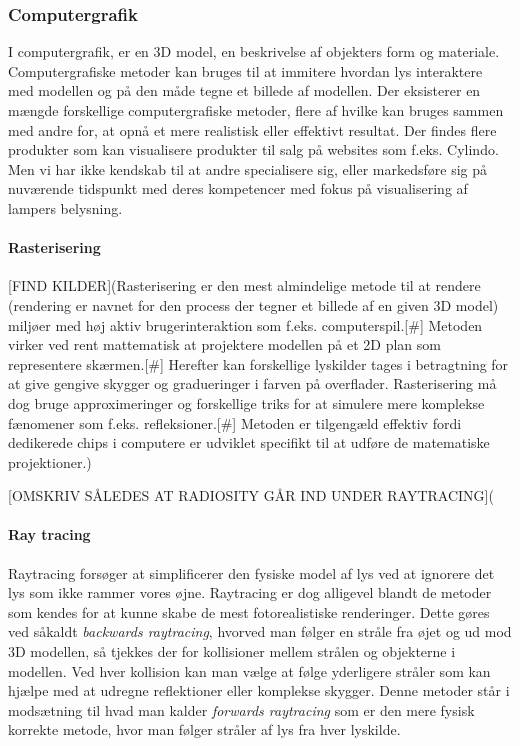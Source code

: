 
\subsubsection{Computergrafik}
I computergrafik, er en 3D model, en beskrivelse af objekters form og materiale.\cite{computergrafik_introduktion} Computergrafiske metoder kan bruges til at immitere hvordan lys interaktere med modellen og på den måde tegne et billede af modellen. Der eksisterer en mængde forskellige computergrafiske metoder, flere af hvilke kan bruges sammen med andre for, at opnå et mere realistisk eller effektivt resultat. Der findes flere produkter som kan visualisere produkter til salg på websites som f.eks. Cylindo\cite{Cylindo}. Men vi har ikke kendskab til at andre specialisere sig, eller markedsføre sig på nuværende tidspunkt med deres kompetencer med fokus på visualisering af lampers belysning.

\paragraph{Rasterisering}
[FIND KILDER](Rasterisering er den mest almindelige metode til at rendere (rendering er navnet for den process der tegner et billede af en given 3D model) miljøer med høj aktiv brugerinteraktion som f.eks. computerspil.[#] Metoden virker ved rent mattematisk at projektere modellen på et 2D plan som representere skærmen.[#] Herefter kan forskellige lyskilder tages i betragtning for at give gengive skygger og gradueringer i farven på overflader. Rasterisering må dog bruge approximeringer og forskellige triks for at simulere mere komplekse fænomener som f.eks. refleksioner.[#] Metoden er tilgengæld effektiv fordi dedikerede chips i computere er udviklet specifikt til at udføre de matematiske projektioner.)

[OMSKRIV SÅLEDES AT RADIOSITY GÅR IND UNDER RAYTRACING](\paragraph{Ray tracing \cite{raytracing_for_begyndere}}
Raytracing forsøger at simplificerer den fysiske model af lys ved at ignorere det lys som ikke rammer vores øjne. Raytracing er dog alligevel blandt de metoder som kendes for at kunne skabe de mest fotorealistiske renderinger. Dette gøres ved såkaldt \textit{backwards raytracing}, hvorved man følger en stråle fra øjet og ud mod 3D modellen, så tjekkes der for kollisioner mellem strålen og objekterne i modellen. Ved hver kollision kan man vælge at følge yderligere stråler som kan hjælpe med at udregne reflektioner eller komplekse skygger. Denne metoder står i modsætning til hvad man kalder \textit{forwards raytracing} som er den mere fysisk korrekte metode, hvor man følger stråler af lys fra hver lyskilde.

